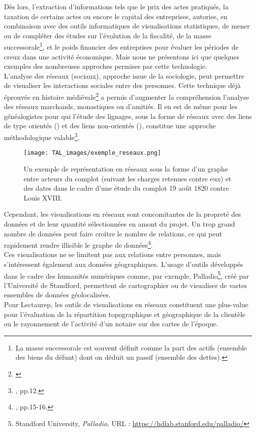 Dès lors, l'extraction d'informations tels que le prix des actes pratiqués, la taxation de certains actes ou encore le capital des entreprises, autorise, en combinaison avec des outils informatiques de visualisations statistiques, de mener ou de compléter des études sur l'évolution de la fiscalité, de la masse successorale\footnote{La masse successorale est souvent définit comme la part des actifs (ensemble des biens du défunt) dont on déduit un passif (ensemble des dettes).}, et le poids financier des entreprises pour évaluer les périodes de creux dans une activité économique. Mais nous ne présentons ici que quelques exemples des nombreuses approches permises par cette technologie.\\

L'analyse des réseaux (sociaux), approche issue de la sociologie, peut permettre de visualiser les interactions sociales entre des personnes. Cette technique déjà éprouvée en histoire médiévale\footnote{\cite{jegou_potentialites_2017}} a permis d'augmenter la compréhension l'analyse des réseaux marchands, monastiques ou d'amitiés. Il en est de même pour les généalogistes pour qui l'étude des lignages, sous la forme de réseaux avec des liens de type orientés () et des liens non-orientés (), constitue une approche méthodologique valable\footnote{\cite{beauguitte_analyse_2016}, pp.12.}.\\

\begin{figure}[h]
    \texttt{[image: TAL\_images/exemple\_reseaux.png]}
    \caption{Un exemple de représentation en réseaux sous la forme d'un graphe entre acteurs du complot (suivant les charges retenues contre eux) et des dates dans le cadre d'une étude du complot 19 août 1820 contre Louis XVIII. \textcopyright\cite{faraut_les_2015}}
    \label{fig:reseaux_graph_medieval}
\end{figure}
\newpage

Cependant, les visualisations en réseaux sont concomitantes de la propreté des données et de leur quantité sélectionnées en amont du projet. Un trop grand nombre de données peut faire croître le nombre de relations, ce qui peut rapidement rendre illisible le graphe de données\footnote{\cite{beauguitte_analyse_2016}, pp.15-16.}.\\

Ces visualisations ne se limitent pas aux relations entre personnes, mais s'intéressent également aux données géographiques. L'usage d'outils développés dans le cadre des humanités numériques comme, par exemple, Palladio\footnote{Standford University, \textit{Palladio}, URL :  \url{https://hdlab.stanford.edu/palladio/}}, créé par l'Université de Standford, permettent de cartographier ou de visualiser de vastes ensembles de données géolocalisées.\\

Pour Lectaurep, les outils de visualisations en réseaux constituent une plus-value pour l'évaluation de la répartition topographique et géographique de la clientèle ou le rayonnement de l'activité d'un notaire sur des cartes de l'époque.\\ 

\newpage
\thispagestyle{empty}

